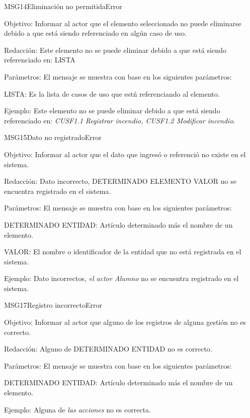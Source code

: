 \begin{mensaje}{MSG14}{Eliminación no permitida}{Error}
    \item[Objetivo:] Informar al actor que el elemento seleccionado no puede eliminarse debido a que está siendo referenciado en algún caso de uso.
    \item[Redacción:] Este elemento no se puede eliminar debido a que está siendo referenciado en: LISTA
    \item[Parámetros:] El mensaje se muestra con base en los siguientes parámetros:
    \begin{Citemize}
	\item LISTA: Es la lista de casos de uso que estń referenciando al elemento.
    \end{Citemize}
    \item[Ejemplo:] Este elemento no se puede eliminar debido a que está siendo referenciado en: {\em CUSF1.1 Registrar incendio, CUSF1.2 Modificar incendio}.
\end{mensaje}
\begin{mensaje}{MSG15}{Dato no registrado}{Error}
    \item[Objetivo:] Informar al actor que el dato que ingresó o referenció no existe en el sistema.
    \item[Redacción:] Dato incorrecto, DETERMINADO ELEMENTO VALOR no se encuentra registrado en el sistema.
    \item[Parámetros:] El mensaje se muestra con base en los siguientes parámetros:
    \begin{Citemize}
	\item DETERMINADO ENTIDAD: Artículo determinado más el nombre de un elemento.
	\item VALOR: El nombre o identificador de la entidad que no está registrada en el sistema.
    \end{Citemize}
    \item[Ejemplo:] Dato incorrectos, { \em el actor Alumno} no se encuentra registrado en el sistema.
\end{mensaje}
\begin{mensaje}{MSG17}{Registro incorrecto}{Error}
    \item[Objetivo:] Informar al actor que alguno de los registros de alguna gestión no es correcto.
    \item[Redacción:] Alguno de DETERMINADO ENTIDAD no es correcto.
    \item[Parámetros:] El mensaje se muestra con base en los siguientes parámetros:
    \begin{Citemize}
	\item DETERMINADO ENTIDAD: Artículo determinado más el nombre de un elemento.
    \end{Citemize}
    \item[Ejemplo:] Alguna de {\em las acciones} no es correcta.
\end{mensaje}

